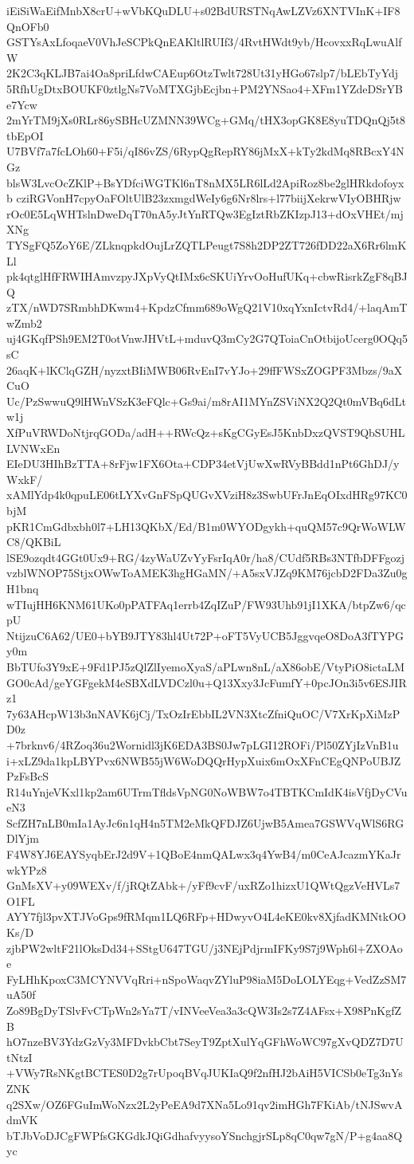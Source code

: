 iEiSiWaEifMnbX8crU+wVbKQuDLU+s02BdURSTNqAwLZVz6XNTVInK+IF8QnOFb0
GSTYsAxLfoqaeV0VhJeSCPkQnEAKltlRUIf3/4RvtHWdt9yb/HcovxxRqLwuAlfW
2K2C3qKLJB7ai4Oa8priLfdwCAEup6OtzTwlt728Ut31yHGo67slp7/bLEbTyYdj
5RfhUgDtxBOUKF0ztlgNs7VoMTXGjbEcjbn+PM2YNSao4+XFm1YZdeDSrYBe7Ycw
2mYrTM9jXs0RLr86ySBHcUZMNN39WCg+GMq/tHX3opGK8E8yuTDQnQj5t8tbEpOI
U7BVf7a7fcLOh60+F5i/qI86vZS/6RypQgRepRY86jMxX+kTy2kdMq8RBcxY4NGz
blsW3LvcOcZKlP+BsYDfciWGTKl6nT8nMX5LR6lLd2ApiRoz8be2glHRkdofoyxb
cziRGVonH7cpyOaFOltUlB23zxmgdWeIy6g6Nr8lrs+l77biijXekrwVIyOBHRjw
rOc0E5LqWHTslnDweDqT70nA5yJtYnRTQw3EgIztRbZKIzpJ13+dOxVHEt/mjXNg
TYSgFQ5ZoY6E/ZLknqpkdOujLrZQTLPeugt7S8h2DP2ZT726fDD22aX6Rr6lmKLl
pk4qtglHfFRWIHAmvzpyJXpVyQtIMx6cSKUiYrvOoHufUKq+cbwRisrkZgF8qBJQ
zTX/nWD7SRmbhDKwm4+KpdzCfmm689oWgQ21V10xqYxnIctvRd4/+laqAmTwZmb2
uj4GKqfPSh9EM2T0otVnwJHVtL+mduvQ3mCy2G7QToiaCnOtbijoUcerg0OQq5sC
26aqK+lKClqGZH/nyzxtBIiMWB06RvEnI7vYJo+29ffFWSxZOGPF3Mbzs/9aXCuO
Uc/PzSwwuQ9lHWnVSzK3eFQlc+Gs9ai/m8rAI1MYnZSViNX2Q2Qt0mVBq6dLtw1j
XfPuVRWDoNtjrqGODa/adH++RWcQz+sKgCGyEsJ5KnbDxzQVST9QbSUHLLVNWxEn
EIeDU3HIhBzTTA+8rFjw1FX6Ota+CDP34etVjUwXwRVyBBdd1nPt6GhDJ/yWxkF/
xAMlYdp4k0qpuLE06tLYXvGnFSpQUGvXVziH8z3SwbUFrJnEqOIxdHRg97KC0bjM
pKR1CmGdbxbh0l7+LH13QKbX/Ed/B1m0WYODgykh+quQM57c9QrWoWLWC8/QKBiL
lSE9ozqdt4GGt0Ux9+RG/4zyWaUZvYyFsrIqA0r/ha8/CUdf5RBs3NTfbDFFgozj
vzblWNOP75StjxOWwToAMEK3hgHGaMN/+A5sxVJZq9KM76jcbD2FDa3Zu0gH1bnq
wTIujHH6KNM61UKo0pPATFAq1errb4ZqIZuP/FW93Uhb91jI1XKA/btpZw6/qcpU
NtijzuC6A62/UE0+bYB9JTY83hl4Ut72P+oFT5VyUCB5JggvqeO8DoA3fTYPGy0m
BbTUfo3Y9xE+9Fd1PJ5zQlZlIyemoXyaS/aPLwn8nL/aX86obE/VtyPiO8ictaLM
GO0cAd/geYGFgekM4eSBXdLVDCzl0u+Q13Xxy3JcFumfY+0pcJOn3i5v6ESJIRz1
7y63AHcpW13b3nNAVK6jCj/TxOzIrEbbIL2VN3XtcZfniQuOC/V7XrKpXiMzPD0z
+7brknv6/4RZoq36u2Wornidl3jK6EDA3BS0Jw7pLGI12ROFi/Pl50ZYjIzVnB1u
i+xLZ9da1kpLBYPvx6NWB55jW6WoDQQrHypXuix6mOxXFnCEgQNPoUBJZPzFsBcS
R14uYnjeVKxl1kp2am6UTrmTfldsVpNG0NoWBW7o4TBTKCmIdK4isVfjDyCVueN3
ScfZH7nLB0mIa1AyJc6n1qH4n5TM2eMkQFDJZ6UjwB5Amea7GSWVqWlS6RGDlYjm
F4W8YJ6EAYSyqbErJ2d9V+1QBoE4nmQALwx3q4YwB4/m0CeAJcazmYKaJrwkYPz8
GnMsXV+y09WEXv/f/jRQtZAbk+/yFf9cvF/uxRZo1hizxU1QWtQgzVeHVLs7O1FL
AYY7fjl3pvXTJVoGps9fRMqm1LQ6RFp+HDwyvO4L4eKE0kv8XjfadKMNtkOOKs/D
zjbPW2wltF21lOksDd34+SStgU647TGU/j3NEjPdjrmIFKy9S7j9Wph6l+ZXOAoe
FyLHhKpoxC3MCYNVVqRri+nSpoWaqvZYluP98iaM5DoLOLYEqg+VedZzSM7uA50f
Zo89BgDyTSlvFvCTpWn2sYa7T/vINVeeVea3a3cQW3Is2s7Z4AFsx+X98PnKgfZB
hO7nzeBV3YdzGzVy3MFDvkbCbt7SeyT9ZptXulYqGFhWoWC97gXvQDZ7D7UtNtzI
+VWy7RsNKgtBCTES0D2g7rUpoqBVqJUKIaQ9f2nfHJ2bAiH5VICSb0eTg3nYsZNK
q2SXw/OZ6FGuImWoNzx2L2yPeEA9d7XNa5Lo91qv2imHGh7FKiAb/tNJSwvAdmVK
bTJbVoDJCgFWPfsGKGdkJQiGdhafvyysoYSnchgjrSLp8qC0qw7gN/P+g4aa8Qyc
